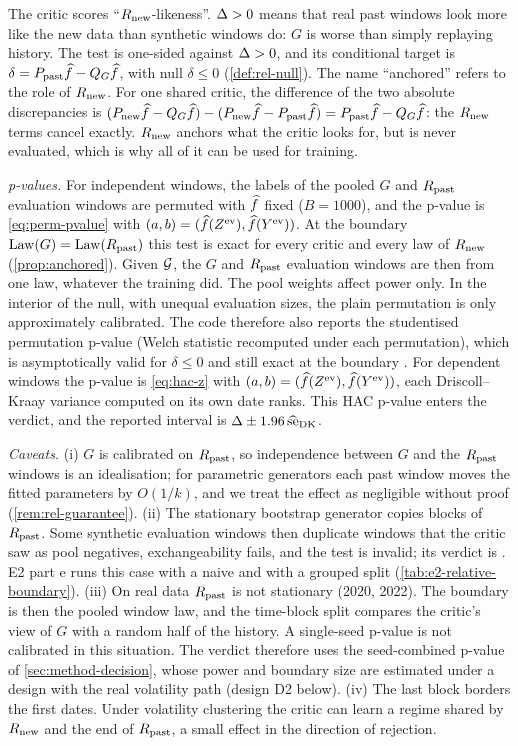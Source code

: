 The critic scores ``$R_{\mathrm{new}}$-likeness''. $\Delta>0$ means that real past windows look more like
the new data than synthetic windows do: $G$ is worse than simply replaying history. The test is
one-sided against $\Delta>0$, and its conditional target is $\delta=P_{\mathrm{past}}\widehat{f}-Q_{G}\widehat{f}$, with
null $\delta\le0$ (\cref{def:rel-null}). The name ``anchored'' refers to the role of $R_{\mathrm{new}}$.
For one shared critic, the difference of the two absolute discrepancies is
$(P_{\mathrm{new}}\widehat{f}-Q_{G}\widehat{f})-(P_{\mathrm{new}}\widehat{f}-P_{\mathrm{past}}\widehat{f})=P_{\mathrm{past}}\widehat{f}-Q_{G}\widehat{f}$: the $R_{\mathrm{new}}$ terms cancel
exactly. $R_{\mathrm{new}}$ anchors what the critic looks for, but is never evaluated, which is why all of
it can be used for training.

\emph{p-values.} For independent windows, the labels of the pooled $G$ and $R_{\mathrm{past}}$ evaluation
windows are permuted with $\widehat{f}$ fixed ($B=1000$), and the p-value is \eqref{eq:perm-pvalue}
with $(a,b)=(\widehat{f}(Z^{\mathrm{ev}}),\widehat{f}(Y^{\mathrm{ev}}))$. At the boundary $\operatorname{Law}(G)=\operatorname{Law}(R_{\mathrm{past}})$ this test
is exact for every critic and every law of $R_{\mathrm{new}}$ (\cref{prop:anchored}). Given $\mathcal{G}$, the
$G$ and $R_{\mathrm{past}}$ evaluation windows are then \iid{} from one law, whatever the training did. The
pool weights affect power only. In the interior of the null, with unequal evaluation sizes, the
plain permutation is only approximately calibrated. The code therefore also reports the
studentised permutation p-value (Welch statistic recomputed under each permutation), which is
asymptotically valid for $\delta\le0$ and still exact at the boundary
\citep{janssen1997studentized,chung2013exact}. For dependent windows the p-value is
\eqref{eq:hac-z} with $(a,b)=(\widehat{f}(Z^{\mathrm{ev}}),\widehat{f}(Y^{\mathrm{ev}}))$, each Driscoll--Kraay variance
computed on its own date ranks. This HAC p-value enters the verdict, and the reported interval
is $\Delta\pm1.96\,\widehat{\mathrm{se}}_{\mathrm{DK}}$.

\emph{Caveats.} (i) $G$ is calibrated on $R_{\mathrm{past}}$, so independence between $G$ and the $R_{\mathrm{past}}$
windows is an idealisation; for parametric generators each past window moves the fitted
parameters by $O(1/k)$, and we treat the effect as negligible without proof
(\cref{rem:rel-guarantee}). (ii) The stationary bootstrap generator copies blocks of $R_{\mathrm{past}}$.
Some synthetic evaluation windows then duplicate windows that the critic saw as pool negatives,
exchangeability fails, and the test is invalid; its verdict is \INVALID{}. E2 part e runs this
case with a naive and with a grouped split (\cref{tab:e2-relative-boundary}). (iii) On real data
$R_{\mathrm{past}}$ is not stationary (2020, 2022). The boundary is then the pooled \TRAIN{} window law,
and the time-block split compares the critic's view of $G$ with a random half of the \TRAIN{}
history. A single-seed p-value is not calibrated in this situation. The verdict therefore uses
the seed-combined p-value of \cref{sec:method-decision}, whose power and boundary size are
estimated under a design with the real \TRAIN{} volatility path (design D2 below). (iv) The last \TRAIN{} block
borders the first \TEST{} dates. Under volatility clustering the critic can learn a regime
shared by $R_{\mathrm{new}}$ and the end of $R_{\mathrm{past}}$, a small effect in the direction of rejection.

